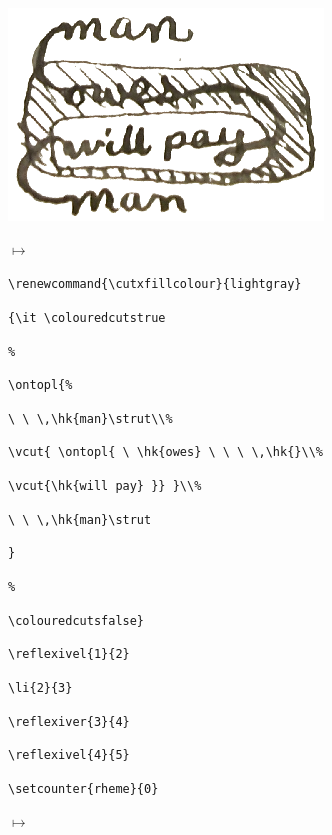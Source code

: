 \documentclass[a4paper,justified]{tufte-handout}
\newcommand{\lm}{\fontfamily{cmr}\selectfont}
\begin{document}
\begin{fullwidth}
\hspace*{1cm}\begin{minipage}{.2\paperwidth}
\includegraphics[scale=0.7]{doc-sources/shaded_cut_ex.eps}
\end{minipage}
$\mapsto$ \ \ \ \ \ 
\begin{minipage}{.25\paperwidth}
{\tiny%
\verb|\renewcommand{\cutxfillcolour}{lightgray}|\medskip

\verb|{\it \colouredcutstrue|

{\lightgray \verb|%|}

\verb|\ontopl{|{\lightgray \verb|%|}

\verb|\ \ \,\hk{man}\strut\\|{\lightgray \verb|%|}

\verb|\vcut{ \ontopl{ \ \hk{owes} \ \ \ \,\hk{}\\|{\lightgray \verb|%|}

\verb|\vcut{\hk{will pay} }} }\\|{\lightgray \verb|%|}

\verb|\ \ \,\hk{man}\strut|

\verb|}|

{\lightgray \verb|%|}

\verb|\colouredcutsfalse}|\medskip

\verb|\reflexivel{1}{2}|

\verb|\li{2}{3}|

\verb|\reflexiver{3}{4}|

\verb|\reflexivel{4}{5}|

\verb|\setcounter{rheme}{0}|
}
\end{minipage}%
$\mapsto$ \ \ \ \ \ 
\begin{minipage}{.25\paperwidth}\hspace*{0.2cm}
\renewcommand{\cutxfillcolour}{lightgray}%
%
{\notinlinefalse\it\lm\colouredcutstrue
{}\notinlinetrue}
\setcounter{rheme}{0}\colouredcutsfalse
\renewcommand{\cutxfillcolour}{gray}
\setlength{\ligaturewidth}{1.35pt}
\end{minipage}


\end{fullwidth}
\end{document}
